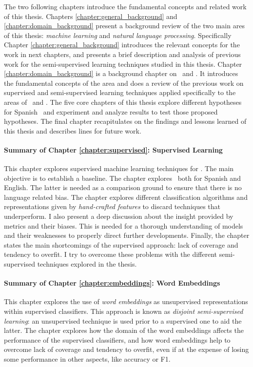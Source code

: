 The two following chapters introduce the fundamental concepts and related work
of this thesis. Chapters \ref{chapter:general_background} and
\ref{chapter:domain_background} present a background review of the two main
ares of this thesis: {\em machine learning} and {\em natural language
processing}. Specifically Chapter \ref{chapter:general_background} introduces
the relevant concepts for the work in next chapters, and presents a brief
description and analysis of previous work for the semi-supervised learning
techniques studied in this thesis. Chapter \ref{chapter:domain_background} is a
background chapter on \nlp~and \wsd. It introduces the fundamental concepts of
the area and does a review of the previous work on supervised and
semi-supervised learning techniques applied specifically to the areas of
\nlp~and \vsd. The five core chapters of this thesis explore different
hypotheses for Spanish \vsd~and experiment and analyze results to test those
proposed hypotheses.  The final chapter recapitulates on the findings and
lessons learned of this thesis and describes lines for future work.

\paragraph{Summary of Chapter \ref{chapter:supervised}: Supervised Learning}

This chapter explores supervised machine learning techniques for \vsd. The main
objective is to establish a baseline. The chapter explores \vsd~both for
Spanish and English. The latter is needed as a comparison ground to ensure that
there is no language related bias. The chapter explores different
classification algorithms and representations given by {\em hand-crafted
features} to discard techniques that underperform. I also present a deep
discussion about the insight provided by metrics and their biases.  This is
needed for a thorough understanding of models and their weaknesses to properly
direct further developments. Finally, the chapter states the main shortcomings
of the supervised approach: lack of coverage and tendency to overfit. I try to
overcome these problems with the different semi-supervised techniques explored
in the thesis.

\paragraph{Summary of Chapter \ref{chapter:embeddings}: Word Embeddings}

This chapter explores the use of {\em word embeddings} as unsupervised
representations within supervised classifiers. This approach is known as {\em
disjoint semi-supervised learning}: an unsupervised technique is used prior to
a supervised one to aid the latter. The chapter explores how the domain of the
word embeddings affects the performance of the supervised classifiers, and how
word embeddings help to overcome lack of coverage and tendency to overfit,
even if at the expense of losing some performance in other aspects, like 
accuracy or F1.

